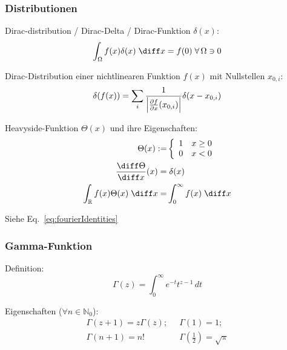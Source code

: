 \documentclass[11pt]{article}
\numberwithin{equation}{section}
\begin{document}
      \subsubsection{Distributionen}
        Dirac-distribution / Dirac-Delta / Dirac-Funktion $\delta(x)$:
        \begin{equation}
          \int_\Omega f(x)\delta(x)\;\diff x = f(0)\;\forall\, \Omega\ni 0
        \end{equation}

        Dirac-Distribution einer nichtlinearen Funktion $f(x)$ mit Nullstellen $x_{0,i}$:
        \begin{equation}
          \delta(f(x)) = \sum_i \frac{1}{\left|\frac{\partial f}{\partial x}(x_{0,i})\right|}\delta(x-x_{0,i})
        \end{equation}

        Heavyside-Funktion $\Theta(x)$ und ihre Eigenschaften:
        \begin{equation}
          \begin{aligned}
            \Theta(x) :=& \left\{\begin{array}{ll}
                1 & x\ge 0 \\
                0 & x<0 \\
              \end{array}\right. \\
              \tder{\Theta}{x}(x) =&\; \delta(x) \\
              \int_{\mathbb{R}} f(x)\Theta(x)\;\diff x =& \int_{0}^{\infty} f(x)\;\diff x
            \end{aligned}
        \end{equation}

        Siehe Eq.~\ref{eq:fourierIdentities}

  		\subsubsection{Gamma-Funktion}
    			Definition:
    			\begin{equation}
    				\Gamma(z)=\int_0^{\infty}e^{-t}t^{z-1}\,dt
    			\end{equation}

    			Eigenschaften ($\forall n\in\mathbb{N}_0$):
    			\begin{equation}
      			\begin{array}{cc}
      				\Gamma(z+1)=z\Gamma(z);
      				&\;\; \Gamma\left(1 \right)=1; \\
      				\Gamma(n+1) = n!
      				&\;\; \Gamma\left(\frac{1}{2} \right)=\sqrt{\pi} \\
      			\end{array}
    			\end{equation}
\end{document}
